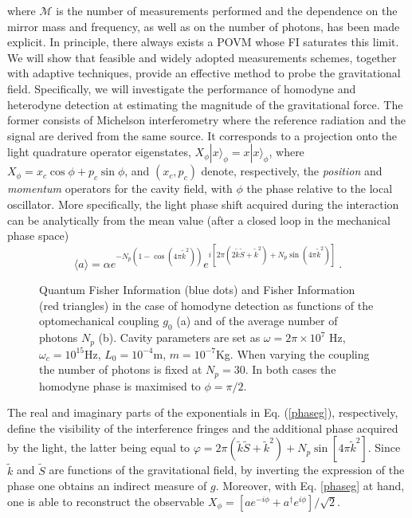 \documentclass[aps,twocolumn,preprintnumbers,amsmath,amssymb]{revtex4}
\newcommand{\ad}{a^{\dag}}
\begin{document}
where $\mathcal{M}$ is the number of measurements performed and the dependence on the mirror mass and frequency, as well as on the number of photons, has been made explicit. In principle, there always exists a POVM whose FI saturates this limit. We will show that feasible and widely adopted measurements schemes, together with adaptive techniques, provide an effective method to probe the gravitational field.
Specifically, we will investigate the performance of homodyne and heterodyne detection at estimating the magnitude of the gravitational force. The former consists of Michelson interferometry where the reference radiation and the signal are derived from the same source. It corresponds to a projection onto the light quadrature operator eigenstates, $X_{\phi}|x\rangle_{\phi}=x|x\rangle_{\phi}$, where $X_{\phi}=x_c \cos\phi+p_c\sin\phi$, and $(x_c, p_c)$ denote, respectively, the {\em position} and {\em momentum} operators for the cavity field, with $\phi$ the phase relative to the local oscillator. More specifically, the light phase shift acquired during the interaction can be analytically from the mean value (after a closed loop in the mechanical phase space)
\begin{equation}\label{phaseg}
\langle a\rangle=\alpha e^{-N_p\left( 1-\cos(4\pi \tilde{k}^2)\right)}e^{i\left[2\pi (2\tilde{k}\tilde{S}+\tilde{k}^2)+N_p\sin(4\pi\tilde{k}^2)\right]}\ .
\end{equation}
\begin{figure}[t!]
\centering
{} 
\caption{Quantum Fisher Information (blue dots) and Fisher Information (red triangles) in the case of homodyne detection as functions of the optomechanical coupling $g_0$ (a) and of the average number of photons $N_p$ (b). Cavity parameters are set as  $\omega=2\pi\times 10^7$ Hz, $\omega_c=10^{15}$Hz, $L_0=10^{-4}$m, $m=10^{-7}$Kg. When varying the coupling the number of photons is fixed at $N_p=30$. In both cases the homodyne phase is maximised to $\phi=\pi/2$.}
\label{Fig2}
\end{figure}
The real and imaginary parts of the exponentials in Eq. (\ref{phaseg}), respectively, define the visibility of the interference fringes and the additional phase acquired by the light, the latter being equal to $\varphi=2\pi(\tilde{k}\tilde{S}+\tilde{k}^2)+N_p\sin[4\pi\tilde{k}^2]$. Since $\tilde{k}$ and $\tilde{S}$ are functions of the gravitational field, by inverting the expression of the phase one obtains an indirect measure of $g$. Moreover, with Eq. \eqref{phaseg} at hand, one is able to reconstruct the observable $X_\phi=[ae^{-i\phi}+\ad e^{i\phi}]/\sqrt{2}$.\\
\end{document}
